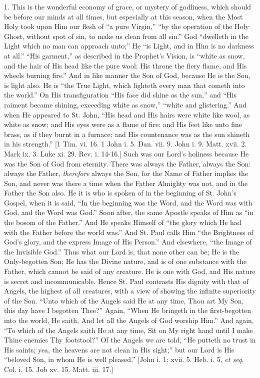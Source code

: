 1. This is the wonderful economy of grace, or mystery of godliness,
which should be before our minds at all times, but especially at this
season, when the Most Holy took upon Him our flesh of ``a pure
Virgin,'' ``by the operation of the Holy Ghost, without spot
of sin, to make us clean from all sin.'' God ``dwelleth in the
Light which no man can approach unto;'' He ``is Light, and in
Him is no darkness at all.'' ``His garment,'' as described
in the Prophet's Vision, is ``white as snow, and the hair of His
head like the pure wool; His throne the fiery flame, and His wheels
burning fire.'' And in like manner the Son of God, because He is
the Son, is light also. He is ``the True Light, which lighteth
every man that cometh into the world.'' On His transfiguration
``His face did shine as the sun,'' and ``His raiment
became shining, exceeding white as snow,'' ``white and
glistering.'' And when He appeared to St. John, ``His head and
His hairs were white like wool, as white as snow; and His eyes were as
a flame of fire: and His feet like unto fine brass, as if they burnt
in a furnace; and His countenance was as the sun shineth in his
strength.'' [1 Tim. vi. 16. 1 John i. 5. Dan. vii. 9. John i. 9.
Matt. xvii. 2. Mark ix. 3. Luke xi. 29. Rev. i. 14-16.] Such was our
Lord's holiness because He was the Son of God from eternity. There was
always the Father, always the Son: always the Father, \emph{therefore}
always the Son, for the Name of Father implies the Son, and never was
there a time when the Father Almighty was not, and in the Father the
Son also. He it is who is spoken of in the beginning of St. John's
Gospel, when it is said, ``In the beginning was the Word, and the
Word was with God, and the Word was God.'' Soon after, the same
Apostle speaks of Him as ``in the bosom of the Father.'' And
He speaks Himself of ``the glory which He had with the Father
before the world was.'' And St. Paul calls Him ``the
Brightness of God's glory, and the express Image of His Person.''
And elsewhere, ``the Image of the Invisible God.'' Thus what
our Lord is, that none other can be; He is the Only-begotten Son; He
has the Divine nature, and is of one substance with the Father, which
cannot be said of any creature. He is one with God, and His nature is
secret and incommunicable. Hence St. Paul contrasts His dignity with
that of Angels, the highest of all creatures, with a view of showing
the infinite superiority of the Son. ``Unto which of the Angels
said He at any time, Thou art My Son, this day have I begotten
Thee?'' Again, ``When He bringeth in the first-begotten into
the world, He saith, And let all the Angels of God worship Him.''
And again, ``To which of the Angels saith He at any time, Sit on
My right hand until I make Thine enemies Thy footstool?'' Of the
Angels we are told, ``He putteth no trust in His saints; yea, the
heavens are not clean in His sight;'' but our Lord is His
``beloved Son, in whom He is well pleased.'' [John i. 1; xvii.
5. Heb. i. 5, \emph{et seq}. Col. i. 15. Job xv. 15. Matt. iii. 17.]

